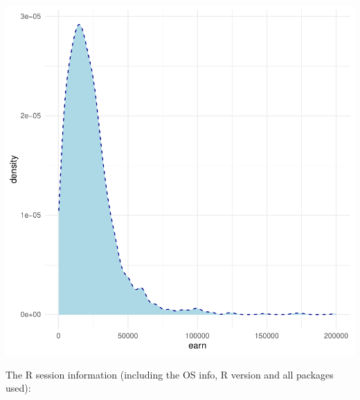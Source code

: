 \documentclass{article}\usepackage[]{graphicx}\usepackage[]{xcolor}
\newenvironment{knitrout}{}{} %
\begin{document}
\begin{knitrout}
{\centering \includegraphics[width=.6\linewidth]{figure/assignment-03-ChattapadhyayKausik-Rnwauto-report-11} 

}


\end{knitrout}

The R session information (including the OS info, R version and all
packages used):
\end{document}
